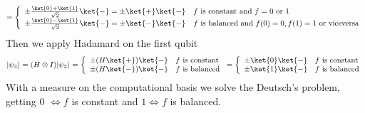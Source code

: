 \documentclass[10pt]{report}
\begin{document}
$$=\left\{\begin{array}{l l}
\pm\frac{\ket{0}+\ket{1}}{\sqrt{2}}\ket{-} = \pm\ket{+}\ket{-} & f\hbox{ is constant and }f= 0\hbox{ or }1\\
\pm\frac{\ket{0}-\ket{1}}{\sqrt{2}}\ket{-} = \pm\ket{-}\ket{-} & f\hbox{ is balanced and }f(0) = 0, f(1) = 1\hbox{ or viceversa}
\end{array}\right. $$
Then we apply Hadamard on the first qubit
$$|\psi_3\rangle = (H\otimes I)|\psi_2\rangle = \left\{\begin{array}{l l}
\pm (H\ket{+})\ket{-}& f\hbox{ is constant}\\
\pm (H\ket{-})\ket{-}& f\hbox{ is balanced}
\end{array}\right. = \left\{\begin{array}{l l}
\pm \ket{0}\ket{-}& f\hbox{ is constant}\\
\pm \ket{1}\ket{-}& f\hbox{ is balanced}
\end{array}\right.$$
With a measure on the computational basis we solve the Deutsch's problem, getting 0 $\Leftrightarrow f$ is constant and $1\Leftrightarrow f$ is balanced.
\end{document}
